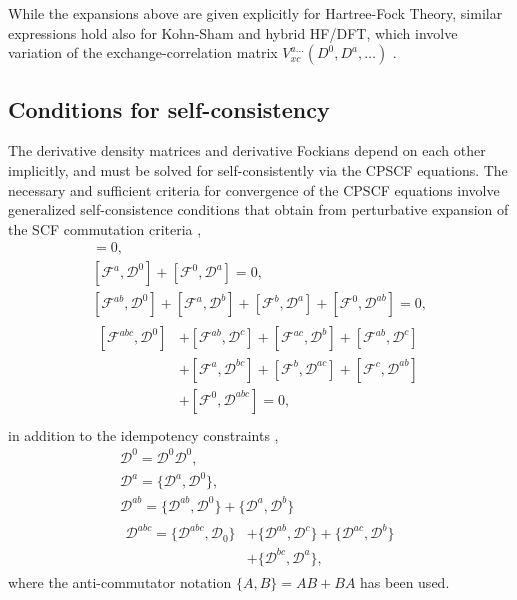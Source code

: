 \documentclass[prl,twocolumn,showpacs,twocolumngrid,superbib]{revtex4}
\def\F{\mathcal{F}}
\def\D{\mathcal{D}}
\begin{document}
While the expansions above are given explicitly for Hartree-Fock Theory, similar expressions 
hold also for Kohn-Sham and hybrid HF/DFT,  which involve variation of the exchange-correlation 
matrix $V_{xc}^{a\ldots}(D^0,D^a,\ldots)$ \cite{ALee94,PSalek02}.

\subsection{Conditions for self-consistency}\label{SelfConsistency}

The derivative density matrices and derivative Fockians depend on 
each other implicitly, and must be solved for self-consistently
via the CPSCF equations.
The necessary and sufficient criteria for convergence of the 
CPSCF equations involve generalized self-consistence conditions 
that obtain from perturbative expansion of the SCF commutation criteria \cite{Furche_2001},
\begin{gather}
    [\F^{0} ,\D^{0}]=0,\label{eq:commutators1}\\
    [\F^{a} ,\D^{0}]+[\F^{0},\D^{a}]=0,\label{eq:commutators2}\\
    [\F^{ab},\D^{0}]+[\F^{a},\D^{b}]+[\F^{b},\D^{a}]+[\F^{0},\D^{ab}]=0,\label{eq:commutators3}\\
  \begin{split}
    [\F^{abc},\D^{0}]&+[\F^{ab},\D^{c}]+[\F^{ac},\D^{b}]+[\F^{ab},\D^{c}]\\
    &+[\F^{a},\D^{bc}]+[\F^{b},\D^{ac}]+[\F^{c},\D^{ab}]\\
    &+[\F^{0},\D^{abc}]=0, \label{eq:commutators4}\\
  \end{split}
\end{gather}
in addition to the idempotency constraints \cite{Furche_2001},
\begin{gather}
  \D^{0} =\D^{0} \D^{0},\label{eq:anticommutators1}\\
  \D^{a} =\{\D^{a},\D^{0}\},\label{eq:anticommutators2}\\
  \D^{ab}=\{\D^{ab},\D^{0}\}+\{\D^{a},\D^{b}\}\label{eq:anticommutators3}\\
  \begin{split}
    \D^{abc}=\{\D^{abc},\D_0\}&+\{\D^{ab},\D^{c}\}+\{\D^{ac},\D^{b}\}\\
    &+\{\D^{bc},\D^{a}\}\label{eq:anticommutators4},
  \end{split}
\end{gather}
where the anti-commutator notation $\{A,B\} = AB+BA$ has been used.
\end{document}
